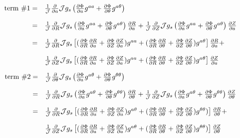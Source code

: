 \documentclass{report}
\newcommand{\ff}[2]{\frac{#1}{#2}}
\newcommand{\pp}[2]{\frac{\partial{#1}}{\partial{#2}}}
\begin{document}
\begin{equation}
\label{eq:poisson7-term1}
   \begin{array}{rl}
\mbox{term \#1}=
 & \ff{1}{\cal J} \pp{}{a} {\cal J} g_s \left( 
           \pp{\Phi}{a} g^{a a} + \pp{\Phi}{\theta} g^{a \theta}
                                        \right)
\\
 & \\
=& \ff{1}{\cal J} \pp{}{R} {\cal J} g_s \left( 
           \pp{\Phi}{a} g^{a a} + \pp{\Phi}{\theta} g^{a \theta}
                                        \right) \pp{R}{a}
   +
   \ff{1}{\cal J} \pp{}{Z} {\cal J} g_s \left( 
           \pp{\Phi}{a} g^{a a} + \pp{\Phi}{\theta} g^{a \theta}
                                        \right) \pp{Z}{a}
\\
 & \\
=&
   \ff{1}{\cal J} \pp{}{R} {\cal J} g_s \left[ 
           (\pp{\Phi}{R} \pp{R}{a} + \pp{\Phi}{Z} \pp{Z}{a}) g^{a a} + 
           (\pp{\Phi}{R} \pp{R}{\theta} +\pp{\Phi}{Z} \pp{Z}{\theta}) g^{a \theta}
                                        \right] \pp{R}{a} +
\\
 & \\
 & \ff{1}{\cal J} \pp{}{Z} {\cal J} g_s \left[ 
           (\pp{\Phi}{R} \pp{R}{a} + \pp{\Phi}{Z} \pp{Z}{a}) g^{a a} + 
           (\pp{\Phi}{R} \pp{R}{\theta} + \pp{\Phi}{Z} \pp{Z}{\theta}) g^{a \theta}
                                        \right] \pp{Z}{a}
\\
   \end{array}
\end{equation}

\begin{equation}
\label{eq:poisson7-term2}
   \begin{array}{rl}
\mbox{term \#2}= 
 & \ff{1}{\cal J} \pp{}{\theta} {\cal J} g_s \left(
           \pp{\Phi}{a} g^{a \theta} + \pp{\Phi}{\theta} g^{\theta \theta}
                                          \right)
\\
 & \\
=& \ff{1}{\cal J} \pp{}{R} {\cal J} g_s \left(
           \pp{\Phi}{a} g^{a \theta} + \pp{\Phi}{\theta} g^{\theta \theta}
                                          \right)\pp{R}{\theta} 
   +
   \ff{1}{\cal J} \pp{}{Z} {\cal J} g_s \left(
           \pp{\Phi}{a} g^{a \theta} + \pp{\Phi}{\theta} g^{\theta \theta}
                                          \right)\pp{Z}{\theta} 
\\
 & \\
=& \ff{1}{\cal J} \pp{}{R} {\cal J} g_s \left[
           (\pp{\Phi}{R} \pp{R}{a} + \pp{\Phi}{Z} \pp{Z}{a}) g^{a \theta} +
           (\pp{\Phi}{R} \pp{R}{\theta} + \pp{\Phi}{Z} \pp{Z}{\theta}) g^{\theta \theta})
                                          \right]\pp{R}{\theta} +
\\
 & \\
 & \ff{1}{\cal J} \pp{}{Z} {\cal J} g_s \left[
           (\pp{\Phi}{R} \pp{R}{a} + \pp{\Phi}{Z} \pp{Z}{a}) g^{a \theta} +
           (\pp{\Phi}{R} \pp{R}{\theta} + \pp{\Phi}{Z} \pp{Z}{\theta}) g^{\theta \theta})
                                          \right]\pp{Z}{\theta} 
\\
   \end{array}
\end{equation}
\end{document}
